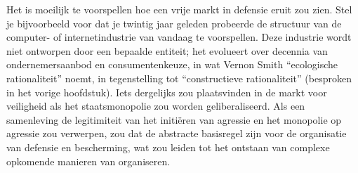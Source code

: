 Het is moeilijk te voorspellen hoe een vrije markt in defensie eruit zou zien. Stel je bijvoorbeeld voor dat je twintig jaar geleden probeerde de structuur van de computer- of internetindustrie van vandaag te voorspellen. Deze industrie wordt niet ontworpen door een bepaalde entiteit; het evolueert over decennia van ondernemersaanbod en consumentenkeuze, in wat Vernon Smith ``ecologische rationaliteit'' noemt, in tegenstelling tot ``constructieve rationaliteit'' (besproken in het vorige hoofdstuk). Iets dergelijks zou plaatsvinden in de markt voor veiligheid als het staatsmonopolie zou worden geliberaliseerd. Als een samenleving de legitimiteit van het initiëren van agressie en het monopolie op agressie zou verwerpen, zou dat de abstracte basisregel zijn voor de organisatie van defensie en bescherming, wat zou leiden tot het ontstaan van complexe opkomende manieren van organiseren.

